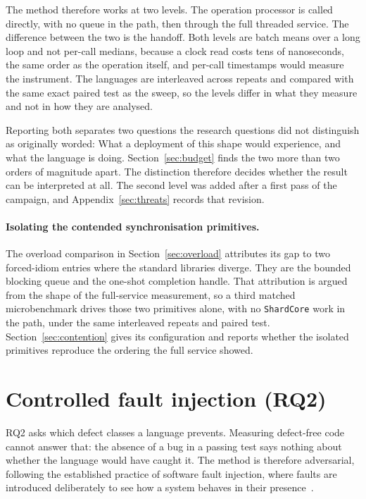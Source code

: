 \documentclass[english,oneside,a4paper,censored,csm,software-track-2020]{HYthesisML}
\begin{document}
\begin{appendices}
The method therefore works at two levels. The operation processor is called directly, with no
queue in the path, then through the full threaded service. The difference between the two is the
handoff. Both levels are batch means over a long loop and not per-call medians, because a clock
read costs tens of nanoseconds, the same order as the operation itself, and per-call timestamps
would measure the instrument. The languages are interleaved across repeats and compared with the
same exact paired test as the sweep, so the levels differ in what they measure and not in how
they are analysed.

Reporting both separates two questions the research questions did not distinguish as originally
worded: What a deployment of this shape would experience, and what the language is doing.
Section~\ref{sec:budget} finds the two more than two orders of magnitude apart. The distinction
therefore decides whether the result can be interpreted at all. The second level was added after
a first pass of the campaign, and Appendix~\ref{sec:threats} records that revision.

\paragraph{Isolating the contended synchronisation primitives.}
The overload comparison in Section~\ref{sec:overload} attributes its gap to two forced-idiom
entries where the standard libraries diverge. They are the bounded blocking queue and the
one-shot completion handle. That attribution is argued from the shape of the full-service
measurement, so a third matched microbenchmark drives those two primitives alone, with no
\texttt{ShardCore} work in the path, under the same interleaved repeats and paired test.
Section~\ref{sec:contention} gives its configuration and reports whether the isolated primitives
reproduce the ordering the full service showed.

\section{Controlled fault injection (RQ2)}\label{sec:methodfaults}
RQ2 asks which defect classes a language prevents. Measuring defect-free code cannot answer
that: the absence of a bug in a passing test says nothing about whether the language would have
caught it. The method is therefore adversarial, following the established practice of software
fault injection, where faults are introduced deliberately to see how a system behaves in their
presence~\cite{natella2016fault}.


\end{appendices}
\end{document}
